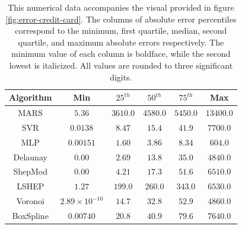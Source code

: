 \documentclass[smallextended,final]{svjour3}       %
\begin{document}
\begin{appendix}
\begin{table}
  \centering
  \begin{tabular}{c|c|c|c|c|c}
    \hline
    Algorithm & Min & $25^{th}$ & $50^{th}$ & $75^{th}$ & Max\\
    \hline
    MARS & $5.36$ & $3610.0$ & $4580.0$ & $5450.0$ & $13400.0$\\
    SVR & $0.0138$ & $8.47$ & $15.4$ & $41.9$ & $7700.0$\\
    MLP & $0.00151$ & $\mathbf{1.60}$ & $\mathbf{3.86}$ & $\mathbf{8.34}$ & $\mathbf{604.0}$\\
    Delaunay & $\mathbf{0.00}$ & $\mathit{2.69}$ & $\mathit{13.8}$ & $\mathit{35.0}$ & $\mathit{4840.0}$\\
    ShepMod & $\mathbf{0.00}$ & $4.21$ & $17.3$ & $51.6$ & $6510.0$\\
    LSHEP & $1.27$ & $199.0$ & $260.0$ & $343.0$ & $6530.0$\\
    Voronoi & $\mathit{2.89 \times 10^{-10}}$ & $14.7$ & $32.8$ & $52.9$ & $4860.0$\\
    BoxSpline & $0.00740$ & $20.8$ & $40.9$ & $79.6$ & $7640.0$\\
    \hline
  \end{tabular}
  \caption{This numerical data accompanies the visual provided in figure \ref{fig:error-credit-card}. The columns of absolute error percentiles correspond to the minimum, first quartile, median, second quartile, and maximum absolute errors respectively. The minimum value of each column is boldface, while the second lowest is italicized. All values are rounded to three significant digits.}
  \label{table:error-credit-card}
\end{table}


\end{appendix}
\end{document}
